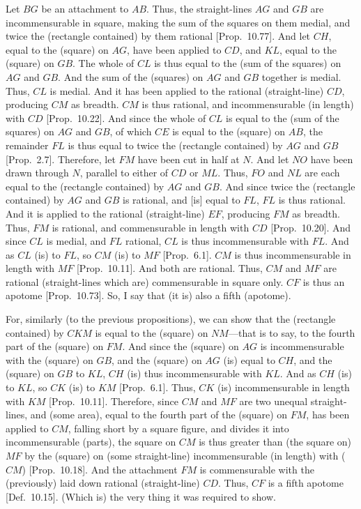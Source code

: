 Let $BG$ be an attachment to $AB$. Thus, the straight-lines $AG$
and $GB$ are incommensurable in square, making the sum of the
squares on them medial, and twice the (rectangle contained) by them
rational [Prop.~10.77]. And let $CH$, equal 
to the (square) on $AG$, have been applied to $CD$, and $KL$, equal
to the (square) on $GB$. The whole of $CL$
is thus equal to the (sum of the squares) on $AG$ and $GB$. 
And the sum of the (squares) on $AG$ and $GB$ together is medial. Thus, $CL$
is medial. And it has been applied to the rational (straight-line) $CD$,
producing $CM$ as breadth. $CM$ is thus rational, and incommensurable
(in length) with $CD$ [Prop.~10.22]. And since the whole
of $CL$ is equal to the (sum of the squares) on $AG$ and $GB$, of
which $CE$ is equal to the (square) on $AB$, the remainder $FL$ is
thus equal to twice the (rectangle contained) by $AG$ and $GB$ [Prop.~2.7]. Therefore, let $FM$ have been
cut in half at $N$. And let $NO$ have been drawn through $N$, parallel
to either of $CD$ or $ML$. Thus, $FO$ and $NL$ are each equal
to the (rectangle contained) by $AG$ and $GB$. And since twice the
(rectangle contained) by $AG$ and $GB$ is rational, and [is]
equal to $FL$, $FL$ is thus rational. And it is applied to the rational
(straight-line) $EF$, producing $FM$ as breadth. Thus, $FM$ is rational,
and commensurable in length with $CD$ [Prop.~10.20]. And since $CL$ is medial, and
$FL$ rational, $CL$ is thus incommensurable with $FL$. 
And as $CL$ (is) to $FL$, so $CM$ (is) to $MF$ [Prop.~6.1]. $CM$ is thus incommensurable in length
with $MF$ [Prop.~10.11]. And both are
rational. Thus, $CM$ and $MF$ are rational (straight-lines which are)
commensurable in square only. $CF$ is thus an apotome [Prop.~10.73].  So, I say that (it is) also
a fifth (apotome).

For, similarly (to the previous propositions), we can show that the
(rectangle contained) by $CKM$ is equal to the (square) on $NM$---that is
to say, to the fourth part of the (square) on $FM$.  And since the (square)
on $AG$ is incommensurable with the (square) on $GB$, and  the
(square) on $AG$ (is)
equal to $CH$, and the (square) on $GB$ to $KL$, $CH$ (is) thus
incommensurable with $KL$. And as $CH$ (is) to $KL$, so
$CK$ (is) to $KM$ [Prop.~6.1]. 
Thus, $CK$ (is) incommensurable in length with $KM$ [Prop.~10.11]. Therefore, since $CM$ and $MF$
are two unequal straight-lines, and (some area), equal to the
fourth part of the (square) on $FM$, has been applied to $CM$, falling
short by a square figure, and divides it into incommensurable
(parts), the square on $CM$ is thus greater than (the square on) $MF$
by the (square) on (some straight-line) incommensurable (in length)
with ($CM$) [Prop.~10.18]. And the attachment
$FM$ is commensurable with the (previously) laid down
rational (straight-line) $CD$. Thus, $CF$ is a fifth apotome [Def.~10.15]. (Which is) the very thing it was required to show.

